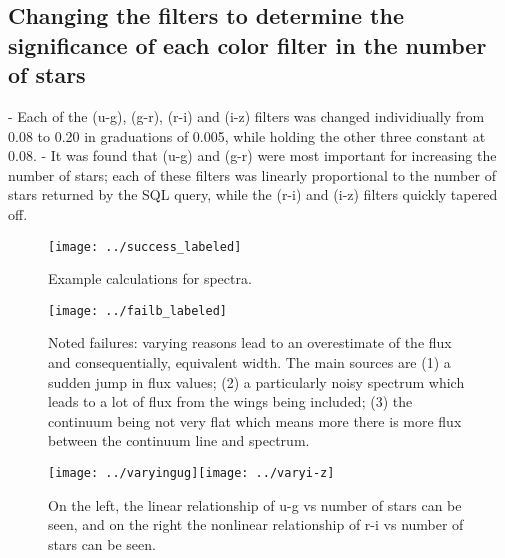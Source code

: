 \documentclass[12pt]{article}
\begin{document}
\subsection{Changing the filters to determine the significance of each color filter in the number of stars}
- Each of the (u-g), (g-r), (r-i) and (i-z) filters was changed individiually from 0.08 to 0.20 in graduations of 0.005, while holding the other three constant at 0.08. 
- It was found that (u-g) and (g-r) were most important for increasing the number of stars; each of these filters was linearly proportional to the number of stars returned by the SQL query, while the (r-i) and (i-z) filters quickly tapered off. 

\begin{figure}
\texttt{[image: ../success\_labeled]}\\
\caption{Example calculations for spectra.}
\end{figure}

\begin{figure}
\texttt{[image: ../failb\_labeled]}\\
\caption{Noted failures: varying reasons lead to an overestimate of the flux and consequentially, equivalent width. The main sources are (1) a sudden jump in flux values; (2) a particularly noisy spectrum which leads to a lot of flux from the wings being included; (3) the continuum being not very flat which means more there is more flux between the continuum line and spectrum.}
\end{figure}
\begin{figure}
\texttt{[image: ../varyingug]}\texttt{[image: ../varyi-z]}\\
\caption{ On the left, the linear relationship of u-g vs number of stars can be seen, and on the right the nonlinear relationship of r-i vs number of stars can be seen.}
\end{figure}
\end{document}

